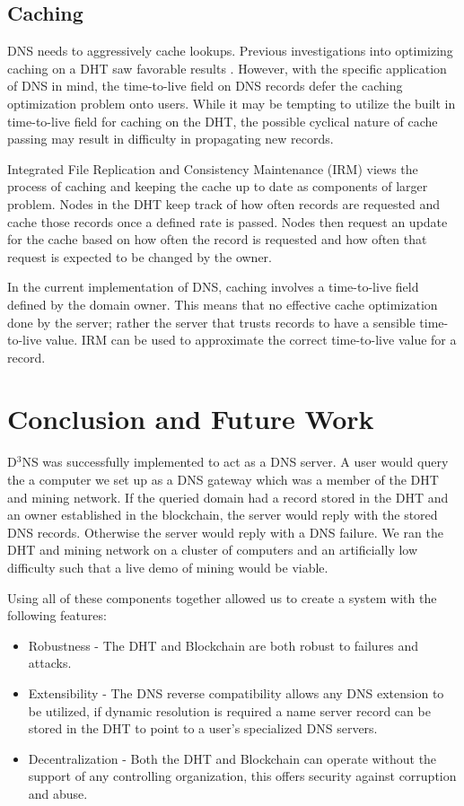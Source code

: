 \documentclass[11pt]{IEEEtran} %
\begin{document}
\subsection{Caching}
DNS needs to aggressively cache lookups. Previous investigations into optimizing caching on a DHT saw favorable results \cite{irm}. However, with the specific application of DNS in mind, the time-to-live field on DNS records defer the caching optimization problem onto users. 
While it may be tempting to utilize the built in time-to-live field for caching on the DHT, the possible cyclical nature of cache passing may result in difficulty in propagating new records.

 
Integrated File Replication and Consistency Maintenance (IRM) \cite{irm} views the process of caching and keeping the cache up to date as components of larger problem.  Nodes in the DHT keep track of how often records are requested and cache those records once a defined rate is passed.  Nodes then request an update for the cache based on how often the record is requested and how often that request is expected to be changed by the owner.


In the current implementation of DNS, caching involves a time-to-live field defined by the domain owner. This means that no effective cache optimization done by the server; rather the server that trusts records to have a sensible time-to-live value. IRM \cite{irm} can be used to approximate the correct time-to-live value for a record.

\section{Conclusion and Future Work}
D$^3$NS was successfully implemented to act as a DNS server.  A user would query the a computer we set up as a DNS gateway which was a member of the DHT and mining network. If the queried domain had a record stored in the DHT and an owner established in the blockchain, the server would reply with the stored DNS records. Otherwise the server would reply with a DNS failure. We ran the DHT and mining network on a cluster of computers and an artificially low difficulty such that a live demo of mining would be viable.

Using all of these components together allowed us to create a system with the following features:
\begin{itemize}
	\item Robustness - The DHT and Blockchain are both robust to failures and attacks.
	\item Extensibility - The DNS reverse compatibility allows any DNS extension to be utilized, if dynamic resolution is required a name server record can be stored in the DHT to point to a user's specialized DNS servers.
	\item Decentralization - Both the DHT and Blockchain can operate without the support of any controlling organization, this offers security against corruption and abuse. 
\end{itemize}	
\end{document}
